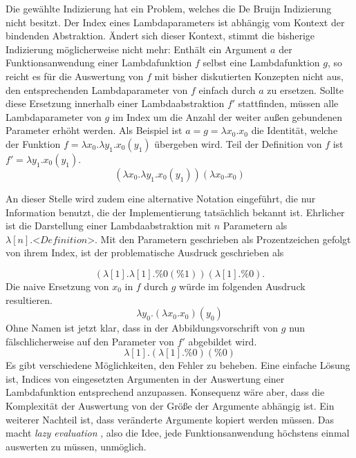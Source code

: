  Die gewählte Indizierung hat ein Problem, welches die De Bruijn Indizierung nicht besitzt. Der Index eines Lambdaparameters ist abhängig vom Kontext der bindenden Abstraktion. Ändert sich dieser Kontext, stimmt die bisherige Indizierung möglicherweise nicht mehr:
 Enthält ein Argument $a$ der Funktionsanwendung einer Lambdafunktion $f$ selbst eine Lambdafunktion $g$, so reicht es für die Auswertung von $f$ mit bisher diskutierten Konzepten nicht aus, den entsprechenden Lambdaparameter von $f$ einfach durch $a$ zu ersetzen. Sollte diese Ersetzung innerhalb einer Lambdaabstraktion $f'$ stattfinden, müssen alle Lambdaparameter von $g$ im Index um die Anzahl der weiter außen gebundenen Parameter erhöht werden. Als Beispiel ist $a = g = \lambda x_0 .x_0$ die Identität, welche der Funktion $f = \lambda x_0 .\lambda y_1 .x_0(y_1)$ übergeben wird. Teil der Definition von $f$ ist $f' = \lambda y_1 .x_0(y_1)$.
 $$(\lambda x_0 .\lambda y_1 .x_0(y_1))(\lambda x_0 .x_0)$$
 
 An dieser Stelle wird zudem eine alternative Notation eingeführt, die nur Information benutzt, die der Implementierung tatsächlich bekannt ist. Ehrlicher ist die Darstellung einer Lambdaabstraktion mit $n$ Parametern als $\lambda [n] .\textit{<Definition>}$. Mit den Parametern geschrieben als Prozentzeichen gefolgt von ihrem Index, ist der problematische Ausdruck geschrieben als
 
 $$(\lambda [1] .\lambda [1] .\%0(\%1))(\lambda [1] .\%0).$$
 Die naive Ersetzung von $x_0$ in $f$ durch $g$ würde im folgenden Ausdruck resultieren.
 $$\lambda y_0 .(\lambda x_0 .x_0)(y_0)$$
 Ohne Namen ist jetzt klar, dass in der Abbildungsvorschrift von $g$ nun fälschlicherweise auf den Parameter von $f'$ abgebildet wird.
 $$\lambda [1] .(\lambda [1] .\%0)(\%0)$$
 Es gibt verschiedene Möglichkeiten, den Fehler zu beheben. Eine einfache Lösung ist, Indices von eingesetzten Argumenten in der Auswertung einer Lambdafunktion entsprechend anzupassen. Konsequenz wäre aber, dass die Komplexität der Auswertung von der Größe der Argumente abhängig ist. Ein weiterer Nachteil ist, dass veränderte Argumente kopiert werden müssen. Das macht \textit{lazy evaluation} \cite{EvalStrategien}, also die Idee, jede Funktionsanwendung höchstens einmal auswerten zu müssen, unmöglich.
 
